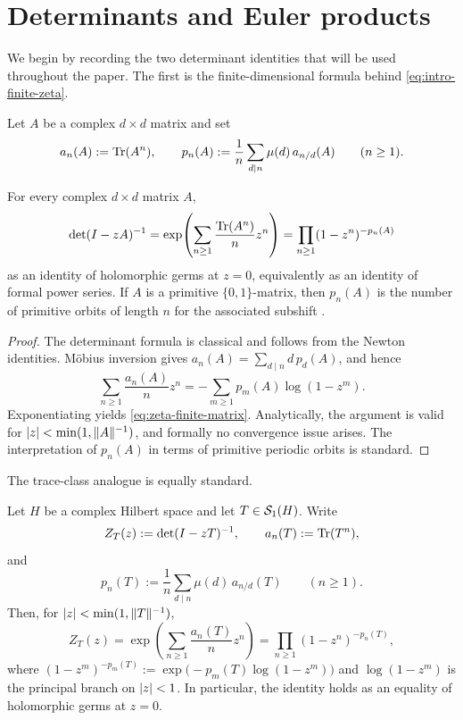 \section{Determinants and Euler products}\label{sec:preliminaries}

We begin by recording the two determinant identities that will be used
throughout the paper. The first is the finite-dimensional formula behind
\eqref{eq:intro-finite-zeta}.

Let \(A\) be a complex \(d\times d\) matrix and set
\[
  a_n(A):=\operatorname{Tr}(A^n),
  \qquad
  p_n(A):=\frac{1}{n}\sum_{d\mid n}\mu(d)\,a_{n/d}(A)
  \qquad (n\ge 1).
\]

\begin{proposition}
  \label{prop:prelim-trace-primitive}
  For every complex \(d\times d\) matrix \(A\),
  \begin{equation}\label{eq:zeta-finite-matrix}
    \det(I-zA)^{-1}
    =\exp\!\left(\sum_{n\ge 1}\frac{\operatorname{Tr}(A^n)}{n}z^n\right)
    =\prod_{n\ge 1}(1-z^n)^{-p_n(A)}
  \end{equation}
  as an identity of holomorphic germs at \(z=0\), equivalently as an
  identity of formal power series. If \(A\) is a primitive
  \(\{0,1\}\)-matrix, then \(p_n(A)\) is the number of primitive orbits
  of length \(n\) for the associated subshift
  \cite{BowenLanford1970Zeta,LindMarcus1995}.
\end{proposition}

\begin{proof}
  The determinant formula is classical and follows from the Newton
  identities. M\"obius inversion gives
  \(
    a_n(A)=\sum_{d\mid n}d\,p_d(A)
  \),
  and hence
  \[
    \sum_{n\ge 1}\frac{a_n(A)}{n}z^n
    =-\sum_{m\ge 1}p_m(A)\log(1-z^m).
  \]
  Exponentiating yields \eqref{eq:zeta-finite-matrix}. Analytically, the
  argument is valid for \(\lvert z \rvert<\min(1,\|A\|^{-1})\), and formally no
  convergence issue arises. The interpretation of \(p_n(A)\) in terms of
  primitive periodic orbits is standard.
\end{proof}

The trace-class analogue is equally standard.

\begin{proposition}
  \label{thm:fredholm-witt-bridge}
  Let \(H\) be a complex Hilbert space and let \(T\in \mathcal S_1(H)\). Write
  \[
    Z_T(z):=\det(I-zT)^{-1},
    \qquad
    a_n(T):=\operatorname{Tr}(T^n),
  \]
  and
  \[
    p_n(T):=\frac{1}{n}\sum_{d\mid n}\mu(d)\,a_{n/d}(T)
    \qquad (n\ge 1).
  \]
  Then, for
  \(\lvert z \rvert<\min(1,\|T\|^{-1})\),
  \[
    Z_T(z)
    =\exp\!\left(\sum_{n\ge 1}\frac{a_n(T)}{n}z^n\right)
    =\prod_{n\ge 1}(1-z^n)^{-p_n(T)},
  \]
  where
  \(
    (1-z^m)^{-p_m(T)}
    :=\exp\!\bigl(-p_m(T)\log(1-z^m)\bigr)
  \)
  and \(\log(1-z^m)\) is the principal branch on \(\lvert z \rvert<1\). In
  particular, the identity holds as an equality of holomorphic germs at
  \(z=0\).
\end{proposition}

